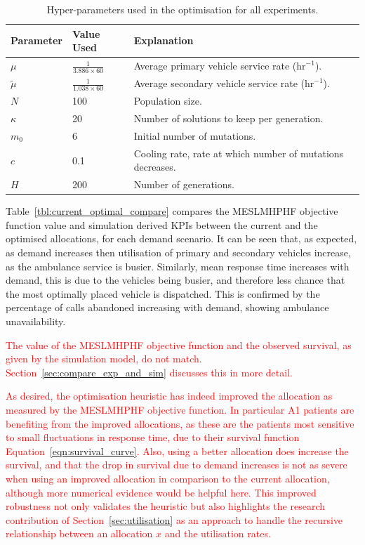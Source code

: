 \documentclass[numbers,webpdf,imaman]{ima-authoring-template}%
\begin{document}
\begin{table}
\centering
\begin{tabular}{lll}
\toprule
Parameter & Value Used & Explanation \\
\midrule
$\mu$ & $\frac{1}{3.886 \times 60}$ & Average primary vehicle service rate ($\text{hr}^{-1}$).\\
$\tilde{\mu}$ & $\frac{1}{1.038 \times 60}$ & Average secondary vehicle service rate ($\text{hr}^{-1}$).\\
$N$ & 100 & Population size.\\
$\kappa$ & 20 & Number of solutions to keep per generation.\\
$m_0$ & 6 & Initial number of mutations.\\
$c$ & 0.1 & Cooling rate, rate at which number of mutations decreases.\\
$H$ & 200 & Number of generations.\\
\bottomrule
\end{tabular}
\caption{Hyper-parameters used in the optimisation for all experiments.}
\label{tbl:hyperparameters}
\end{table}

Table~\ref{tbl:current_optimal_compare} compares the MESLMHPHF objective
function value and simulation derived KPIs between the current and the optimised
allocations, for each demand scenario. It can be seen that, as expected, as
demand increases then utilisation of primary and secondary vehicles increase, as
the ambulance service is busier. Similarly, mean response time increases with
demand, this is due to the vehicles being busier, and therefore less chance that
the most optimally placed vehicle is dispatched. This is confirmed by the
percentage of calls abandoned increasing with demand, showing ambulance
unavailability.

\textcolor{red}{The value of the MESLMHPHF objective function and
the observed survival, as given by the simulation model, do not match.
Section~\ref{sec:compare_exp_and_sim} discusses this in more detail.}

\textcolor{red}{As desired, the optimisation heuristic has indeed improved the
allocation as measured by the MESLMHPHF objective function. In particular A1 patients 
are benefiting from the improved
allocations, as these are the patients most sensitive to small fluctuations in
response time, due to their survival function Equation~\ref{eqn:survival_curve}.
Also, using a better allocation does increase the survival,
and that the drop in survival due to demand increases is not as severe when
using an improved allocation in comparison to the current allocation, although
more numerical evidence would be helpful here. This
improved robustness 
not only validates the heuristic but also highlights
the research contribution of Section~\ref{sec:utilisation} as an approach to
handle the recursive relationship between an allocation \(x\) and the utilisation
rates.}
\end{document}
